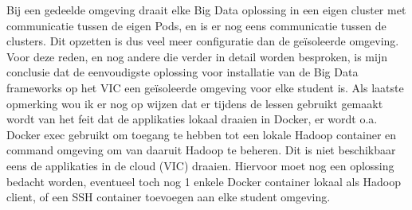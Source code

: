 Bij een gedeelde omgeving draait elke Big Data oplossing in een eigen cluster met communicatie tussen de eigen Pods, en is er nog eens communicatie tussen de clusters. Dit opzetten is dus veel meer configuratie dan de geïsoleerde omgeving.
\newline
Voor deze reden, en nog andere die verder in detail worden besproken, is mijn conclusie dat de eenvoudigste oplossing voor installatie van de Big Data frameworks op het VIC een geïsoleerde omgeving voor elke student is.
\newline
\newline
Als laatste opmerking wou ik er nog op wijzen dat er tijdens de lessen gebruikt gemaakt wordt van het feit dat de applikaties lokaal draaien in Docker, er wordt o.a. Docker exec gebruikt om toegang te hebben tot een lokale Hadoop container en command omgeving om van daaruit Hadoop te beheren. Dit is niet beschikbaar eens de applikaties in de cloud (VIC) draaien. Hiervoor moet nog een oplossing bedacht worden, eventueel toch nog 1 enkele Docker container lokaal als Hadoop client, of een SSH container toevoegen aan elke student omgeving.
\newline

